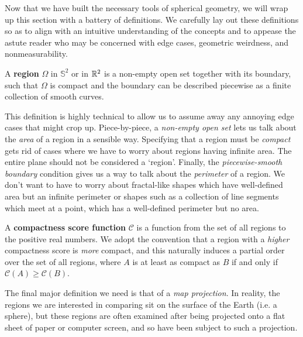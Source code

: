 Now that we have built the necessary tools of spherical geometry, we will wrap up this section with a battery of definitions. 
We carefully lay out these definitions so
as to align with an intuitive understanding of the concepts and to
appease the astute reader who may be concerned with edge cases,
geometric weirdness, and nonmeasurability. 









\begin{definition}
	A \textbf{region} $\Omega$ in $\mathbb{S}^2$ or 
	in $\mathbb{R}^2$ is a non-empty open set together with its
	boundary, such that $\Omega$ is compact and the boundary can be described piecewise as 
	a finite collection of smooth curves.
\end{definition}

This definition is highly technical to allow us to assume away any annoying edge 
cases that might crop up.  Piece-by-piece, a \textit{non-empty open set} lets us 
talk about the \textit{area} of a region in a sensible way. Specifying that a region 
must be \textit{compact} gets rid of cases where we have to worry about regions having 
infinite area.  The entire plane should not be considered a `region'.  Finally, the 
\textit{piecewise-smooth boundary} condition gives us a way to talk about the \textit{perimeter} 
of a region.  We don't want to have to worry about fractal-like shapes which have well-defined 
area but an infinite perimeter or shapes such as a collection of line segments which meet at a point, which has a well-defined perimeter but no area.










\begin{definition}
  A \textbf{compactness score function} $\mathcal{C}$ is a function from
  the set of all regions to the positive real numbers.  We adopt the
  convention that a region with a \textit{higher} compactness score is
  \textit{more} compact, and this naturally induces a partial order over
  the set of all regions, where $A$ is at least as compact as $B$ if and
  only if $\mathcal{C}(A)\geq \mathcal{C}(B)$.
\end{definition}

The final major definition we need is that of a \textit{map
projection}.  In reality, the regions we are interested in comparing
sit on the surface of the Earth (i.e. a sphere), but these regions are
often examined after being projected onto a flat sheet of paper or
computer screen, and so have been subject to such a projection.

